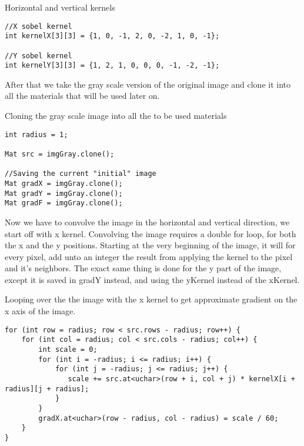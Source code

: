     \begin{listing}[H]
    	\caption{Horizontal and vertical kernels}
    	\label{listing:kernels}
    	\begin{verbatim}
//X sobel kernel
int kernelX[3][3] = {1, 0, -1, 2, 0, -2, 1, 0, -1};

//Y sobel kernel
int kernelY[3][3] = {1, 2, 1, 0, 0, 0, -1, -2, -1};
    	\end{verbatim}
    \end{listing}
	After that we take the gray scale version of the original image and clone it into all the materials that will be used later on. 
\begin{listing}[H]
	\caption{Cloning the gray scale image into all the to be used materials}
	\label{listing:matClone}
	\begin{verbatim}
int radius = 1;

Mat src = imgGray.clone();

//Saving the current "initial" image
Mat gradX = imgGray.clone();
Mat gradY = imgGray.clone();
Mat gradF = imgGray.clone();
	\end{verbatim}
\end{listing}\newpage
Now we have to convolve the image in the horizontal and vertical direction, we start off with x kernel. Convolving the image requires a double for loop, for both the x and the y positions. Starting at the very beginning of the image, it will for every pixel, add unto an integer the result from applying the kernel to the pixel and it's neighbors. The exact same thing is done for the y part of the image, except it is saved in gradY instead, and using the yKernel instead of the xKernel.
\begin{listing}[H]
	\caption{Looping over the the image with the x kernel to get approximate gradient on the x axis of the image.}
	\label{listing:xLoop}
	\begin{verbatim}
for (int row = radius; row < src.rows - radius; row++) {
	for (int col = radius; col < src.cols - radius; col++) {
		int scale = 0;
		for (int i = -radius; i <= radius; i++) {
			for (int j = -radius; j <= radius; j++) {
			   scale += src.at<uchar>(row + i, col + j) * kernelX[i + radius][j + radius];
			}
		}
		gradX.at<uchar>(row - radius, col - radius) = scale / 60;
	}
}
	\end{verbatim}
\end{listing}

